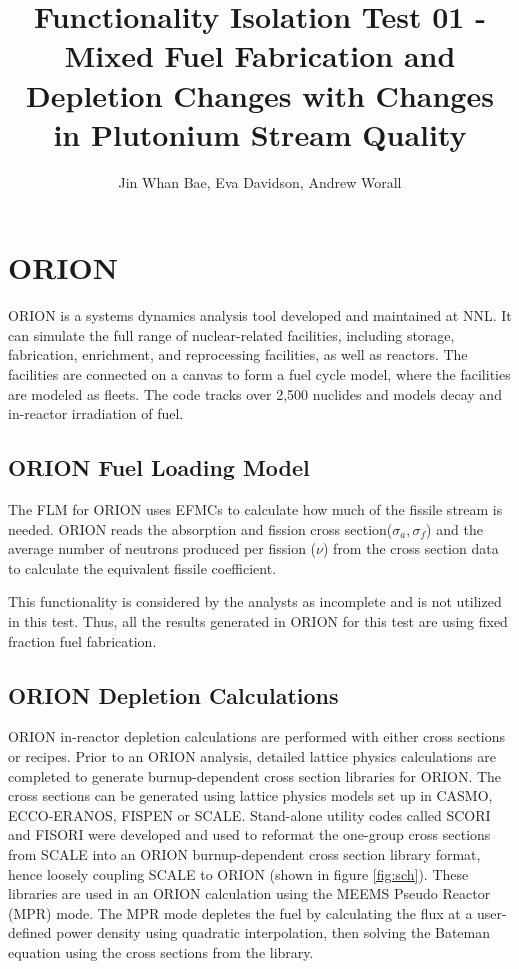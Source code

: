 \documentclass{article}
\title{Functionality Isolation Test 01 - Mixed Fuel Fabrication and Depletion Changes with
        Changes in Plutonium Stream Quality}
\author{Jin Whan Bae, Eva Davidson, Andrew Worall}
\begin{document}
\section{ORION}
ORION \cite{gregg_benefits_2013} is a systems dynamics analysis tool developed and maintained at \gls{NNL}.
It can simulate the full range of nuclear-related facilities, including storage, fabrication, enrichment,
and reprocessing facilities, as well as reactors. The facilities are connected on a canvas to form a
fuel cycle model, where the facilities are modeled as fleets. The code tracks over 2,500 nuclides
and models decay and in-reactor irradiation of fuel.

\subsection{ORION Fuel Loading Model}
The \gls{FLM} for ORION uses \glspl{EFMC} to calculate how much of the fissile stream is needed. ORION reads
the absorption and fission cross section($\sigma_a, \sigma_f$) and the average number of neutrons produced per fission ($\nu$)
from the cross section data to calculate the equivalent fissile coefficient.

This functionality is considered by the analysts as incomplete and is not utilized in this test. Thus, all the results
generated in ORION for this test are using fixed fraction fuel fabrication.

\subsection{ORION Depletion Calculations}
ORION in-reactor depletion calculations are performed with either cross sections or recipes.
Prior to an ORION analysis, detailed lattice physics calculations are completed to generate burnup-dependent
cross section libraries for ORION. The cross sections can be generated using lattice physics models set up in CASMO,
ECCO-ERANOS, FISPEN or SCALE. Stand-alone utility codes called SCORI and FISORI were developed and used to reformat
the one-group cross sections from SCALE into an ORION burnup-dependent cross section library format, hence loosely
coupling SCALE to ORION (shown in figure \ref{fig:sch}). These libraries are used in an ORION calculation using the MEEMS Pseudo Reactor (MPR) mode.
The MPR mode depletes the fuel by calculating the flux at a user-defined power density using quadratic interpolation,
 then solving the Bateman equation using the cross sections from the library. 
\end{document}
